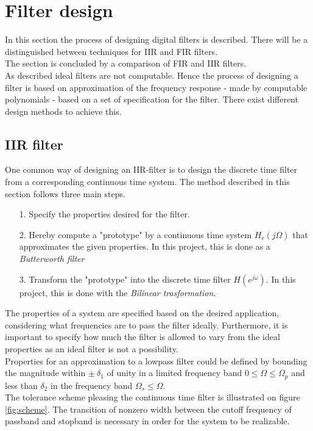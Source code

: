 \section{Filter design}
In this section the process of designing digital filters is described. There will be a distinguished between techniques for IIR and FIR filters.\\ The section is concluded by a comparison of FIR and IIR filters.\\  
As described ideal filters are not computable. Hence the process of designing a filter is based on approximation of the frequency response - made by computable polynomials - based on a set of specification for the filter. There exist different design methods to achieve this.   
\subsection{IIR filter}
One common way of designing an IIR-filter is to design the discrete time filter from a corresponding continuous time system. The method described in this section follows three main steps. 
\begin{itemize}
\item[1.] Specify the properties desired for the filter.
\item[2.] Hereby compute a "prototype" by a continuous time system $H_c(j\Omega)$ that approximates the given properties. In this project, this is done as a \textit{Butterworth filter}  
\item[3.] Transform the "prototype" into the discrete time filter $H(e^{j\omega})$. In this project, this is done with the \textit{Bilinear trasformation}. 
\end{itemize}
The properties of a system are specified based on the desired application, considering what frequencies are to pass the filter ideally. Furthermore, it is important to specify how much the filter is allowed to vary from the ideal properties as an ideal filter is not a possibility. \\
Properties for an approximation to a lowpass filter could be defined by bounding the magnitude within $\pm \ \delta_1$ of unity in a limited frequency band $0 \leq \Omega \leq \Omega_p $ and less than $\delta_2$ in the frequency band $\Omega_s \leq \Omega$. \\
The tolerance scheme pleasing the continuous time filter is illustrated on figure \ref{fig:scheme}.
The transition of nonzero width between the cutoff frequency of passband and stopband is necessary in order for the system to be realizable.

